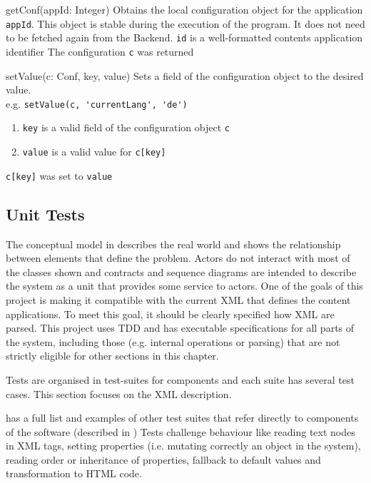 \begin{sopcontract}{getConf(appId: Integer)}
{Obtains the local configuration object for the application \texttt{appId}. This object is stable during the execution of the program. It does not need to be fetched again from the Backend.}
{\texttt{id} is a well-formatted contents application identifier}
{The configuration \texttt{c} was returned}
\end{sopcontract}

\begin{sopcontract}{setValue(c: Conf, key, value)}
{Sets a field of the configuration object to the desired value.\\ e.g. \lstinline$setValue(c, 'currentLang', 'de')$}
{
\begin{enumerate}
    \item \texttt{key} is a valid field of the configuration object \texttt{c}
    \item \texttt{value} is a valid value for \lstinline$c[key]$
\end{enumerate}
}
{\lstinline$c[key]$ was set to \texttt{value}}
\end{sopcontract}

\subsection{Unit Tests}
The conceptual model in  describes the real world and shows the relationship between elements that define the problem.
Actors do not interact with most of the classes shown and contracts and sequence diagrams are intended to describe the system as a unit that provides some service to actors.
One of the goals of this project is making it compatible with the current \ac{XML} that defines the content applications.
To meet this goal, it should be clearly specified how \ac{XML} are parsed.
This project uses \ac{TDD} and has executable specifications for all parts of the system, including those (e.g. internal operations or parsing) that are not strictly eligible for other sections in this chapter.

Tests are organised in test-suites for components and each suite has several test cases.
This section focuses on the \ac{XML} description.

 has a full list and examples of other test suites that refer directly to components of the software (described in )
Tests challenge behaviour like reading text nodes in \ac{XML} tags, setting properties (i.e. mutating correctly an object in the system), reading order or inheritance of properties, fallback to default values and transformation to \ac{HTML} code.

